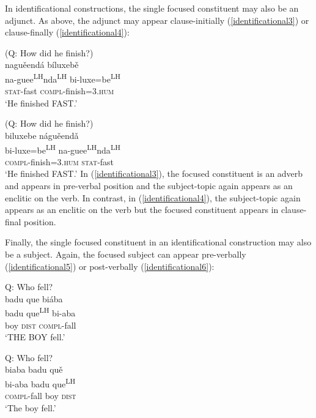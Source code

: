 In identificational constructions, the single focused constituent may also be an adjunct. As above, the adjunct may appear clause-initially (\ref{identificational3}) or clause-finally (\ref{identificational4}):

\ea\label{identificational3} 
(Q: How did he finish?) \\
\glll nagu\v{e}end\'{a} b\'{i}luxeb\v{e}  \\
na-guee\textsuperscript{LH}nda\textsuperscript{LH} bi-luxe=be\textsuperscript{LH}  \\
\textsc{stat}-fast \textsc{compl}-finish=\textsc{3.hum}  \\
\glt `He finished FAST.'
\z

\ea\label{identificational4} 
(Q: How did he finish?) \\
\glll biluxebe n\'{a}gu\v{e}end\v{a}  \\
bi-luxe=be\textsuperscript{LH} na-guee\textsuperscript{LH}nda\textsuperscript{LH}  \\
\textsc{compl}-finish=\textsc{3.hum} \textsc{stat}-fast   \\
\glt `He finished FAST.'
\z
In (\ref{identificational3}), the focused constituent is an adverb and appears in pre-verbal position and the subject-topic again appears as an enclitic on the verb. In contrast, in (\ref{identificational4}), the subject-topic again appears as an enclitic on the verb but the focused constituent appears in clause-final position. 

Finally, the single focused constituent in an identificational construction may also be a subject. Again, the focused subject can appear pre-verbally (\ref{identificational5}) or post-verbally (\ref{identificational6}): 

\ea\label{identificational5} 
{Q: Who fell?} \\
\glll badu que bi\'{a}ba \\
badu que\textsuperscript{LH} bi-aba  \\
boy \textsc{dist} \textsc{compl}-fall   \\
\glt `THE BOY fell.'
\z

\ea\label{identificational6}  
{Q: Who fell?} \\
\glll biaba badu qu\v{e}  \\
bi-aba badu que\textsuperscript{LH}  \\
\textsc{compl}-fall boy \textsc{dist}  \\
\glt `The boy fell.'
\z

